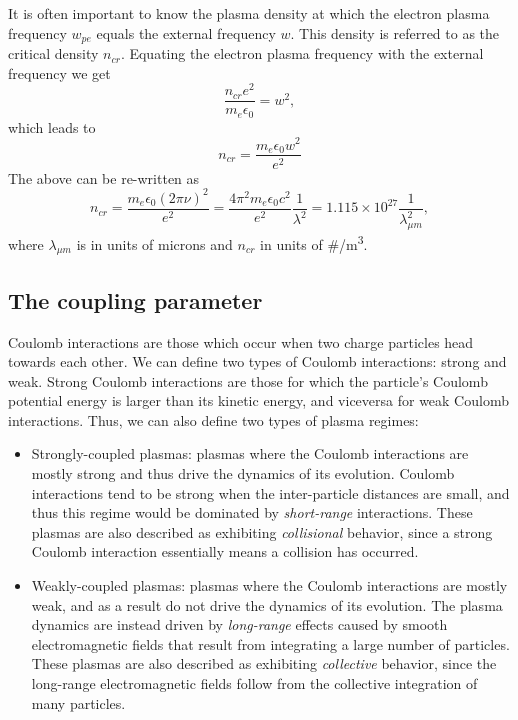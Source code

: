 \documentclass[a4paper,11pt]{report}
\begin{document}
It is often important to know the plasma density at which the electron plasma frequency $w_{pe}$ equals the external frequency $w$. This density is referred to as the critical density $n_{cr}$. Equating the electron plasma frequency with the external frequency we get
\begin{equation*}
    \frac{n_{cr} e^2}{m_e \epsilon_0} = w^2,
\end{equation*}
which leads to
\begin{equation}
    \label{eq:plas_freq_crit_den}
    n_{cr} = \frac{m_e \epsilon_0 w^2}{e^2}
\end{equation}
The above can be re-written as
\begin{equation*}
    n_{cr} = \frac{m_e \epsilon_0 (2 \pi \nu)^2}{e^2} = \frac{4 \pi^2 m_e \epsilon_0 c^2}{e^2} \frac{1}{\lambda^2} = 1.115 \times 10^{27} \frac{1}{\lambda_{\mu m}^2},
\end{equation*}
where $\lambda_{\mu m}$ is in units of microns and $n_{cr}$ in units of \#/m\textsuperscript{3}.

\subsection{The coupling parameter}

Coulomb interactions are those which occur when two charge particles head towards each other. We can define two types of Coulomb interactions: strong and weak. Strong Coulomb interactions are those for which the particle's Coulomb potential energy is larger than its kinetic energy, and viceversa for weak Coulomb interactions. Thus, we can also define two types of plasma regimes:
\begin{itemize}
    \item Strongly-coupled plasmas: plasmas where the Coulomb interactions are mostly strong and thus drive the dynamics of its evolution. Coulomb interactions tend to be strong when the inter-particle distances are small, and thus this regime would be dominated by \textit{short-range} interactions. These plasmas are also described as exhibiting \textit{collisional} behavior, since a strong Coulomb interaction essentially means a collision has occurred.
    \item Weakly-coupled plasmas: plasmas where the Coulomb interactions are mostly weak, and as a result do not drive the dynamics of its evolution. The plasma dynamics are instead driven by \textit{long-range} effects caused by smooth electromagnetic fields that result from integrating a large number of particles. These plasmas are also described as exhibiting \textit{collective} behavior, since the long-range electromagnetic fields follow from the collective integration of many particles.
\end{itemize}
\end{document}
